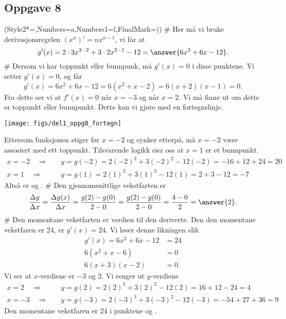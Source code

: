 \subsection*{Oppgave 8}
\begin{easylist}[enumerate]
	\ListProperties(Style2*=,Numbers=a,Numbers1=l,FinalMark={)})
	# Her må vi bruke derivasjonsregelen $\left(x^n\right)' = n x^{n-1}$, vi får at
	\begin{equation*}
		g'(x) = 2 \cdot 3 x^{3-2} + 3 \cdot 2 x^{2-1} - 12 = \answer{6x^2 + 6x - 12}.
	\end{equation*}
	# Dersom vi har toppunkt eller bunnpunk, må $g'(x)= 0$ i disse punktene. Vi setter $g'(x) = 0$, og får
	\begin{equation*}
		g'(x) = 6x^2 + 6x - 12 = 6(x^2 + x - 2) = 6(x+2)(x-1)= 0.
	\end{equation*}
	Fra dette ser vi at $f'(x) = 0$ når $x = -3$ og når $x = 2$. Vi må finne ut om dette er toppunkt eller bunnpunkt. Dette kan vi gjøre med en fortegnslinje.
	\begin{center}
		\texttt{[image: figs/del1\_oppg8\_fortegn]}
	\end{center}
	Ettersom funksjonen stiger før $x=-2$ og synker etterpå, må $x=-2$ være assosiert med ett toppunkt. Tilsvarende logikk sier oss at $x=1$ er et bunnpunkt.
	\begin{align*}
		x = -2 \quad \Rightarrow& \quad y = g(-2) = 2(-2)^3 + 3 (-2)^2 - 12(-2) = -16 + 12 + 24 = 20 \\
		x = 1 \quad \Rightarrow& \quad y = g(1) = 2(1)^3 + 3 (1)^2 - 12(1) = 2 + 3 - 12 = -7
	\end{align*}
	Altså er  og .
	# Den gjennomsnittlige vekstfarten er 
	\begin{equation*}
		\frac{\Delta y}{\Delta x} = \frac{\Delta g(x)}{\Delta x} = \frac{g(2) - g(0)}{2 - 0} = \frac{g(2) - g(0)}{2 - 0} = \frac{4 - 0}{2} = \answer{2}.
	\end{equation*}
	# Den momentane vekstfarten er verdien til den deriverte.
	Den den momentane vekstfaren er 24, er $g'(x) = 24$. 
	Vi løser denne likningen slik
	\begin{align*}
		g'(x) = 6x^2 + 6x - 12 &= 24 \\
		6(x^2 + x - 6) &= 0 \\
		6(x + 3)(x - 2) &= 0.
	\end{align*}
	Vi ser at $x$-verdiene er $-3$ og $2$. Vi renger ut $y$-verdiene
	\begin{align*}
	x = 2 \quad \Rightarrow& \quad y = g(2) = 2(2)^3 + 3 (2)^2 - 12(2) = 16 + 12 - 24 = 4\\
	x = -3 \quad \Rightarrow& \quad y = g(-3) = 2(-3)^3 + 3 (-3)^2 - 12(-3) = -54 + 27 + 36 = 9
	\end{align*}
	Den momentane vekstfaren er $24$ i punktene  og .
\end{easylist}

